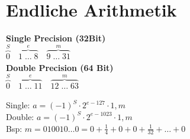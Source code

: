 \documentclass[a4paper,twocolumn]{article}
\begin{document}
		






\section{Endliche Arithmetik}

	\begin{fdef}
		\textbf{Single Precision (32Bit)}\\
			$\stackrel{S}{\overbrace{0}} \quad \stackrel{e}{\overbrace{1 \; \ldots \; 8}} \quad \stackrel{m}{\overbrace{9 \; \ldots \; 31}}$\\[2mm]
		\textbf{Double Precision (64 Bit)}\\
			$\stackrel{S}{\overbrace{0}} \quad \stackrel{e}{\overbrace{1 \; \ldots \; 11}} \quad \stackrel{m}{\overbrace{12 \; \ldots \; 63}}$
	\end{fdef}
	
	\begin{fmerke}
		Single: $a = (-1)^S \cdot 2^{e-127} \cdot 1,m$\\
		Double: $a = (-1)^S \cdot 2^{e-1023} \cdot 1,m$\\[1mm]
		Bsp: $m = 010010 \ldots 0 = 0 + \frac{1}{4} + 0 + 0 + \frac{1}{32} + \ldots + 0$ 
	\end{fmerke}
		
\end{document}
